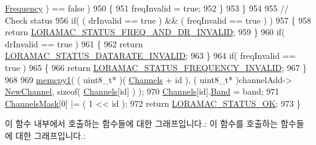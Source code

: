 \begin{DoxyCode}
      \mbox{\hyperlink{structs_channel_params_ade3d190636488dad9a89b19446b7acf1}{Frequency}} ) == \textcolor{keyword}{false} )
950         \{
951             freqInvalid = \textcolor{keyword}{true};
952         \}
953     \}
954 
955     \textcolor{comment}{// Check status}
956     \textcolor{keywordflow}{if}( ( drInvalid == \textcolor{keyword}{true} ) && ( freqInvalid == \textcolor{keyword}{true} ) )
957     \{
958         \textcolor{keywordflow}{return} \mbox{\hyperlink{group___l_o_r_a_m_a_c_gga1d18f26b344040b3ec5c3db662919661a163a1a739baee13607068af42f2e9d30}{LORAMAC\_STATUS\_FREQ\_AND\_DR\_INVALID}};
959     \}
960     \textcolor{keywordflow}{if}( drInvalid == \textcolor{keyword}{true} )
961     \{
962         \textcolor{keywordflow}{return} \mbox{\hyperlink{group___l_o_r_a_m_a_c_gga1d18f26b344040b3ec5c3db662919661aa910e51ef7a7cf64c27dd3ffe5eb9d38}{LORAMAC\_STATUS\_DATARATE\_INVALID}};
963     \}
964     \textcolor{keywordflow}{if}( freqInvalid == \textcolor{keyword}{true} )
965     \{
966         \textcolor{keywordflow}{return} \mbox{\hyperlink{group___l_o_r_a_m_a_c_gga1d18f26b344040b3ec5c3db662919661ae3ea7b89796aed5a320013d9743b2955}{LORAMAC\_STATUS\_FREQUENCY\_INVALID}};
967     \}
968 
969     \mbox{\hyperlink{utilities_8c_abfbe672c7136122f16c9214bc4ba8d21}{memcpy1}}( ( uint8\_t* )( \mbox{\hyperlink{_region_k_r920_8c_aa22cc2ed5f1e155ccf4f0c0388da513e}{Channels}} + \textcolor{keywordtype}{id} ), ( uint8\_t* )channelAdd->
      \mbox{\hyperlink{structs_channel_add_params_afc31493a105479490228fd896b20b45c}{NewChannel}}, \textcolor{keyword}{sizeof}( \mbox{\hyperlink{_region_k_r920_8c_aa22cc2ed5f1e155ccf4f0c0388da513e}{Channels}}[\textcolor{keywordtype}{id}] ) );
970     \mbox{\hyperlink{_region_k_r920_8c_aa22cc2ed5f1e155ccf4f0c0388da513e}{Channels}}[id].\mbox{\hyperlink{structs_channel_params_a724c03aa06953111c3291243831f251b}{Band}} = band;
971     \mbox{\hyperlink{_region_k_r920_8c_a2188957b5ca6af8092154d7ccbfa5757}{ChannelsMask}}[0] |= ( 1 << id );
972     \textcolor{keywordflow}{return} \mbox{\hyperlink{group___l_o_r_a_m_a_c_gga1d18f26b344040b3ec5c3db662919661a03db5fca052313edb3823c014b653a74}{LORAMAC\_STATUS\_OK}};
973 \}
\end{DoxyCode}
이 함수 내부에서 호출하는 함수들에 대한 그래프입니다.\+:
이 함수를 호출하는 함수들에 대한 그래프입니다.\+:
\mbox{\label{group___r_e_g_i_o_n_k_r920_gaada1222081dd856fe052d63f94bb78dd}} 
